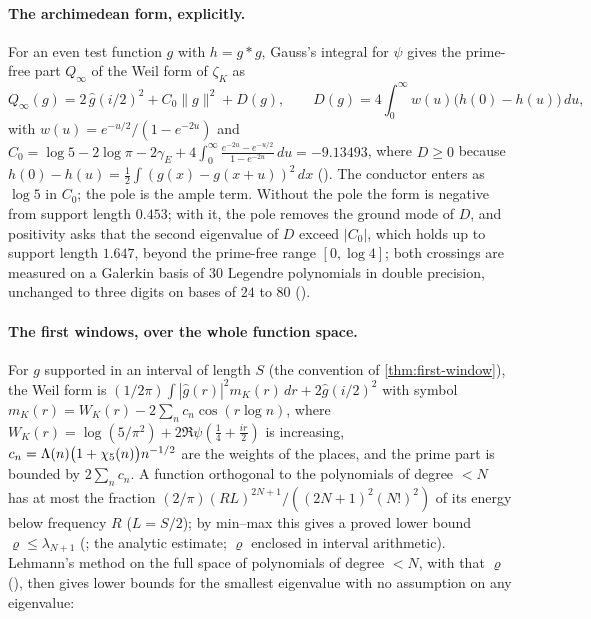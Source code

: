 \paragraph{The archimedean form, explicitly.}  For an even test function $g$ with $h=g*g$, Gauss's
integral for $\psi$ gives the prime-free part $Q_\infty$ of the Weil form of $\zeta_K$ as
\[
  Q_\infty(g)=2\,\hat g(i/2)^2+C_0\|g\|^2+D(g),\qquad D(g)=4\int_0^\infty w(u)\bigl(h(0)-h(u)\bigr)\,du,
\]
with $w(u)=e^{-u/2}/(1-e^{-2u})$ and $C_0=\log5-2\log\pi-2\gamma_E+4\int_0^\infty\frac{e^{-2u}-e^{-u/2}}{1-e^{-2u}}\,du=-9.13493$,
where $D\ge0$ because $h(0)-h(u)=\frac12\int(g(x)-g(x+u))^2\,dx$ ().  The
conductor enters as $\log5$ in $C_0$; the pole is the ample term.  Without the pole the form is
negative from support length $0.453$; with it, the pole removes the ground mode of $D$, and
positivity asks that the second eigenvalue of $D$ exceed $|C_0|$, which holds up to support length
$1.647$, beyond the prime-free range $[0,\log4]$; both crossings are measured on a Galerkin basis
of $30$ Legendre polynomials in double precision, unchanged to three digits on bases of $24$ to $80$
().

\paragraph{The first windows, over the whole function space.}  For $g$ supported in an interval
of length $S$ (the convention of \cref{thm:first-window}), the Weil form is
$(1/2\pi)\int|\hat g(r)|^2m_K(r)\,dr+2\hat g(i/2)^2$ with symbol
$m_K(r)=W_K(r)-2\sum_n c_n\cos(r\log n)$, where $W_K(r)=\log(5/\pi^2)+2\Re\psi(\frac14+\frac{ir}2)$ is
increasing, $c_n=\Lambda(n)\bigl(1+\chi_5(n)\bigr)n^{-1/2}$ are the weights of the places, and the prime part is bounded by $2\sum_nc_n$.  A function orthogonal to the
polynomials of degree $<N$ has at most the fraction
$(2/\pi)(RL)^{2N+1}/((2N+1)^2(N!)^2)$ of its energy below frequency $R$ ($L=S/2$); by min--max this
gives a proved lower bound $\varrho\le\lambda_{N+1}$ (; the analytic
estimate; $\varrho$ enclosed in interval arithmetic).  Lehmann's method on the full space of
polynomials of degree $<N$, with that $\varrho$ (), then gives
lower bounds for the smallest eigenvalue with no assumption on any eigenvalue:

